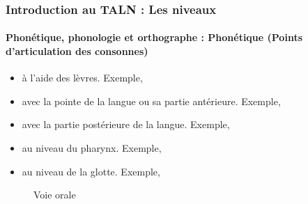 \documentclass{beamer}
\begin{document}
\begin{frame}
\frametitle{Introduction au TALN : Les niveaux}
\framesubtitle{Phonétique, phonologie et orthographe : Phonétique (Points d'articulation des consonnes)}

\begin{minipage}{0.5\textwidth}
\begin{itemize}
	\item {} à l'aide des lèvres. Exemple, \expword{\textipa{[b], [p], [m], [f], [v]}}
	\item {} avec la pointe de la langue ou sa partie antérieure. 
	Exemple, 
	\item {} avec la partie postérieure de la langue. Exemple, 
	\item {} au niveau du pharynx. 
	Exemple, 
	\item {} au niveau de la glotte. 
	Exemple, 
\end{itemize}
\end{minipage}
\begin{minipage}{0.48\textwidth}
	\begin{figure}
		\caption{Voie orale \cite{2009-ball}}
	\end{figure}
\end{minipage}

\end{frame}
\end{document}
